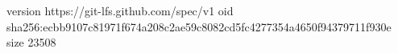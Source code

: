 version https://git-lfs.github.com/spec/v1
oid sha256:ecbb9107c81971f674a208c2ae59c8082cd5fc4277354a4650f94379711f930e
size 23508
